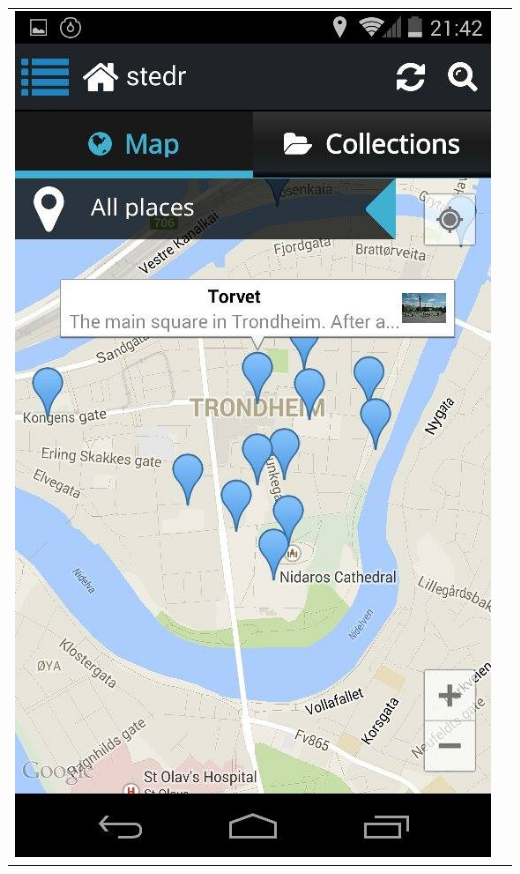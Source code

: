 \documentclass[12pt,a4paper,titlepage]{article}
\begin{document}
\begin{appendices}
\begin{center}
\begin{tabular}{cc}
	 	\includegraphics[width=0.35 \textwidth]{res/ScreenShot8.jpg}\\
\end{tabular}
\end{center}


\end{appendices}
\end{document}
